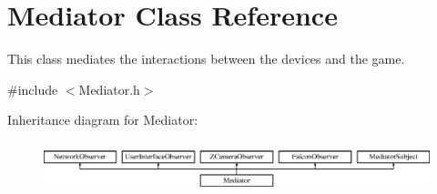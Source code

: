 \hypertarget{classMediator}{
\section{Mediator Class Reference}
\label{classMediator}
}


This class mediates the interactions between the devices and the game.  




{\ttfamily \#include $<$Mediator.h$>$}

Inheritance diagram for Mediator:\begin{figure}[H]
\begin{center}
\leavevmode
\includegraphics[height=1.493333cm]{classMediator}
\end{center}
\end{figure}
